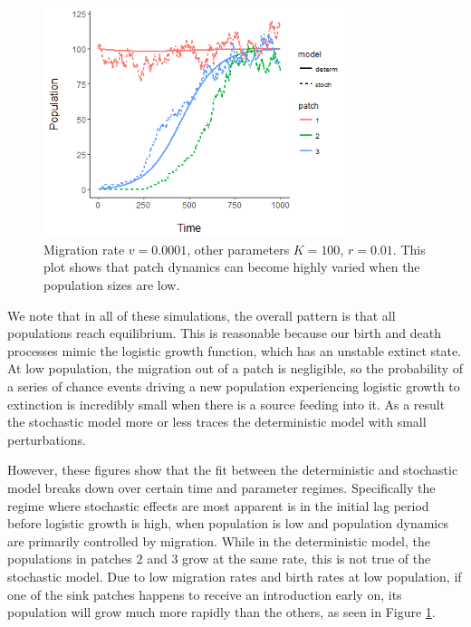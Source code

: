 \documentclass[12pt, openany]{book}
\theoremstyle{definition}
\theoremstyle{remark}
\numberwithin{equation}{chapter}
\numberwithin{figure}{chapter}
\begin{document}
\begin{figure}[t!]
\begin{center}
       \includegraphics[width=0.8\textwidth]{pop100stochv0001.png}
       \caption{Migration rate $v = 0.0001$, other parameters $K = 100$, $r = 0.01$. This plot shows that patch dynamics can become highly varied when the population sizes are low. \label{pop100stochv0001}}
\end{center}
\end{figure}  
We note that in all of these simulations, the overall pattern is that all populations reach equilibrium. This is reasonable because our birth and death processes mimic the logistic growth function, which has an unstable extinct state. At low population, the migration out of a patch is negligible, so the probability of a series of chance events driving a new population experiencing logistic growth to extinction is incredibly small when there is a source feeding into it. As a result the stochastic model more or less traces the deterministic model with small perturbations.

However, these figures show that the fit between the deterministic and stochastic model breaks down over certain time and parameter regimes. Specifically the regime where stochastic effects are most apparent is in the initial lag period before logistic growth is high, when population is low and population dynamics are primarily controlled by migration. While in the deterministic model, the populations in patches $2$ and $3$ grow at the same rate, this is not true of the stochastic model. Due to low migration rates and birth rates at low population, if one of the sink patches happens to receive an introduction early on, its population will grow much more rapidly than the others, as seen in Figure \ref{pop100stochv0001}. 
\end{document}
